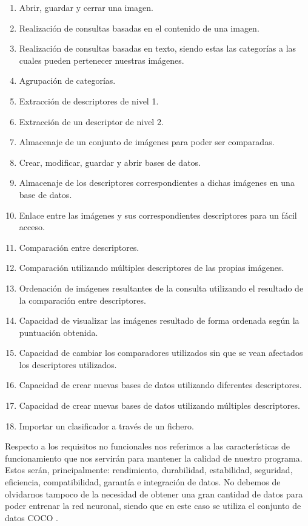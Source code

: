 \begin{enumerate}
\item Abrir, guardar y cerrar una imagen.
\item Realización de consultas basadas en el contenido de una imagen.
\item Realización de consultas basadas en texto, siendo estas las categorías a las cuales pueden pertenecer nuestras imágenes.
\item Agrupación de categorías.
\item Extracción de descriptores de nivel 1.
\item Extracción de un descriptor de nivel 2.
\item Almacenaje de un conjunto de imágenes para poder ser comparadas.
\item Crear, modificar, guardar y abrir bases de datos.
\item Almacenaje de los descriptores correspondientes a dichas imágenes en una base de datos.
\item Enlace entre las imágenes y sus correspondientes descriptores para un fácil acceso.
\item Comparación entre descriptores.
\item Comparación utilizando múltiples descriptores de las propias imágenes.
\item Ordenación de imágenes resultantes de la consulta utilizando el resultado de la comparación entre descriptores.
\item Capacidad de visualizar las imágenes resultado de forma ordenada según la puntuación obtenida.
\item Capacidad de cambiar los comparadores utilizados sin que se vean afectados los descriptores utilizados.
\item Capacidad de crear nuevas bases de datos utilizando diferentes descriptores.
\item Capacidad de crear nuevas bases de datos utilizando múltiples descriptores.
\item Importar un clasificador a través de un fichero.
\end{enumerate}
Respecto a los requisitos no funcionales nos referimos a las características de funcionamiento que nos servirán para mantener la calidad de nuestro programa. Estos serán, principalmente: rendimiento, durabilidad, estabilidad, seguridad, eficiencia, compatibilidad, garantía e integración de datos. No debemos de olvidarnos tampoco de la necesidad de obtener una gran cantidad de datos para poder entrenar la red neuronal, siendo que en este caso se utiliza el conjunto de datos COCO \cite{COCO}.\\

